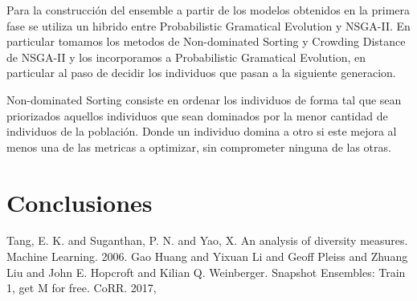 \documentclass[runningheads,a4paper]{llncs}
\begin{document}
	Para la construcción del ensemble a partir de los modelos obtenidos en la primera fase se utiliza un
	hibrido entre Probabilistic Gramatical Evolution y NSGA-II. En particular tomamos los metodos de
	Non-dominated Sorting y Crowding Distance de NSGA-II y los incorporamos a Probabilistic Gramatical
	Evolution, en particular al paso de decidir los individuos que pasan a la siguiente generacion.
	
	Non-dominated Sorting consiste en ordenar los individuos de forma tal que sean priorizados aquellos
	individuos que sean dominados por la menor cantidad de individuos de la población. Donde un individuo
	domina a otro si este mejora al menos una de las metricas a optimizar, sin comprometer ninguna de las
	otras.
	
	\section*{Conclusiones}
	
	
	\begin{thebibliography}{4}
		
		 Tang, E. K. and Suganthan, P. N. and Yao, X. An analysis of diversity measures. Machine Learning. 2006.
		 Gao Huang and Yixuan Li and Geoff Pleiss and Zhuang Liu and John E. Hopcroft and Kilian Q. Weinberger. Snapshot Ensembles: Train 1, get {M} for free. CoRR. 2017,
		
	\end{thebibliography}
	
	
\end{document}

